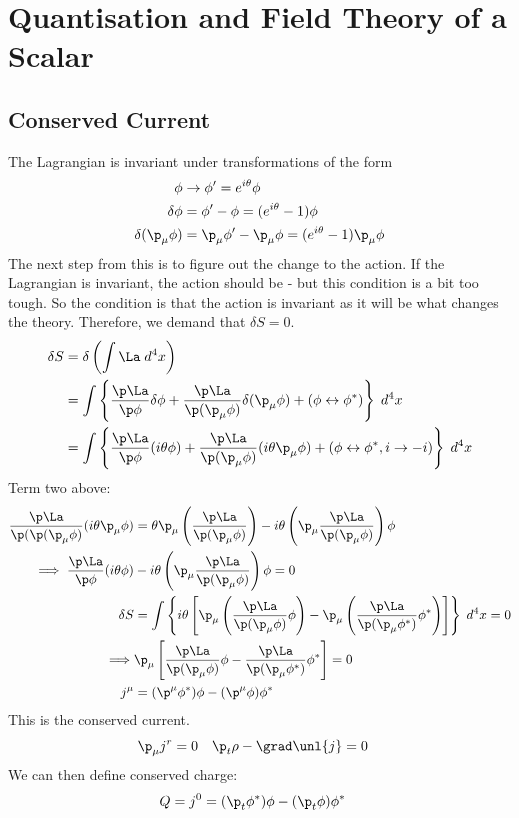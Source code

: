 \documentclass[a4paper, 11pt, normalem]{report}
\begin{document}
\chapter{Quantisation and Field Theory of a Scalar}
\section{Conserved Current}
The Lagrangian is invariant under transformations of the form
\begin{align}
    \phi &\to \phi' = e^{i\theta}\phi \\
    \delta\phi &= \phi'-\phi = (e^{i\theta}-1)\phi \\
    \delta(\p_\mu\phi) &= \p_\mu\phi' - \p_\mu\phi = (e^{i\theta}-1)\p_\mu\phi
\end{align}
The next step from this is to figure out the change to the action.
If the Lagrangian is invariant, the action should be - but this condition is a bit too tough.
So the condition is that the action is invariant as it will be what changes the theory.
Therefore, we demand that $\delta S = 0$.
\begin{align}
    \delta S &= \delta\left( \int \La\;d^4x\right) \\
             &= \int \left\{ \frac{\p\La}{\p\phi}\delta\phi + \frac{\p\La}{\p(\p_\mu\phi)}\delta(\p_\mu\phi) + (\phi\leftrightarrow\phi^*)\right\}\;d^4x \\
             &= \int \left\{\frac{\p\La}{\p\phi}(i\theta\phi) + \frac{\p\La}{\p(\p_\mu\phi)}(i\theta\p_\mu\phi) + (\phi\leftrightarrow\phi^*,i\to-i)  \right\}\;d^4x
\end{align}
Term two above:
\begin{align}
    \frac{\p\La}{\p(\p(\p_\mu\phi)}(i\theta\p_\mu\phi) &= \theta\p_\mu\left(\frac{\p\La}{\p(\p_\mu\phi)}\right) - i\theta\left(\p_\mu\frac{\p\La}{\p(\p_\mu\phi)}\right)\phi \\
    \implies \frac{\p\La}{\p\phi}(i\theta\phi) &- i\theta\left(\p_\mu\frac{\p\La}{\p(\p_\mu\phi)}\right)\phi = 0 \\
    \delta S &= \int \left\{i\theta\left[\p_\mu\left(\frac{\p\La}{\p(\p_\mu\phi)}\phi\right) - \p_\mu\left(\frac{\p\La}{\p(\p_\mu\phi^*)}\phi^*\right)\right]\right\}\;d^4x = 0 \\
    \implies &\p_\mu\left[\frac{\p\La}{\p(\p_\mu\phi)} \phi - \frac{\p\La}{\p(\p_\mu\phi^*)}\phi^*\right] = 0 \\
    j^\mu &= (\p^\mu\phi^*)\phi - (\p^\mu\phi)\phi^*
\end{align}
This is the conserved current.
\begin{align}
    \p_\mu j^r &= 0 & \p_t\rho - \grad\unl{j} &= 0
\end{align}
We can then define conserved charge:
\begin{align}
    Q &= j^0 = (\p_t\phi^*)\phi - (\p_t\phi)\phi^*
\end{align}
\end{document}
